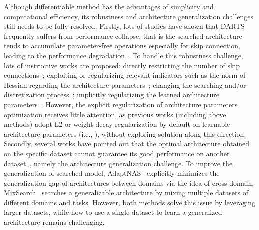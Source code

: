 \documentclass[10pt,twocolumn,letterpaper]{article}
\begin{document}
Although differentiable method has the advantages of simplicity and computational efficiency, its robustness and architecture generalization challenges still needs to be fully resolved. 
Firstly, lots of studies have shown that DARTS frequently suffers from performance collapse, that is the searched architecture tends to accumulate parameter-free operations especially for skip connection, leading to the performance degradation~\cite{darts-,rdarts}. To handle this robustness challenge, lots of instructive works are proposed: directly restricting the number of skip connections~\cite{pdarts,darts+}; exploiting or regularizing relevant indicators such as the norm of Hessian regarding the architecture parameters~\cite{rdarts,sdarts}; changing the searching and/or discretization process~\cite{fairdarts,dots,darts-}; implicitly regularizing the learned architecture parameters~\cite{rdarts}. However, the explicit regularization of architecture parameters optimization receives little attention, as previous works (including above methods) adopt L2 or weight decay regularization by default on learnable architecture parameters (i.e., ), without exploring solution along this direction. Secondly, several works have pointed out that the optimal architecture obtained on the specific dataset cannot guarantee its good performance on another dataset~\cite{adaptNAS,mixsearch}, namely the architecture generalization challenge. To improve the generalization of searched model, AdaptNAS~\cite{adaptNAS} explicitly minimizes the generalization gap of architectures between domains via the idea of cross domain,
MixSearch~\cite{mixsearch} searches a generalizable architecture by mixing multiple datasets of different domains and tasks. 
However, both methods solve this issue by leveraging larger datasets, while how to use a single dataset to learn a generalized architecture remains challenging. 
\end{document}
